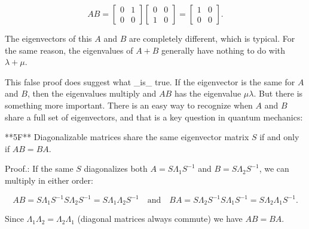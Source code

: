 \[AB=\begin{bmatrix}0&1\\ 0&0\end{bmatrix}\begin{bmatrix}0&0\\ 1&0\end{bmatrix}=\begin{bmatrix}1&0\\ 0&0\end{bmatrix}.\]

The eigenvectors of this \(A\) and \(B\) are completely different, which is typical. For the same reason, the eigenvalues of \(A+B\) generally have nothing to do with \(\lambda+\mu\).

This false proof does suggest what _is_ true. If the eigenvector is the same for \(A\) and \(B\), then the eigenvalues multiply and \(AB\) has the eigenvalue \(\mu\lambda\). But there is something more important. There is an easy way to recognize when \(A\) and \(B\) share a full set of eigenvectors, and that is a key question in quantum mechanics:

**5F** Diagonalizable matrices share the same eigenvector matrix \(S\) if and only if \(AB=BA\).

Proof.: If the same \(S\) diagonalizes both \(A=S\Lambda_{1}S^{-1}\) and \(B=S\Lambda_{2}S^{-1}\), we can multiply in either order:

\[AB=S\Lambda_{1}S^{-1}S\Lambda_{2}S^{-1}=S\Lambda_{1}\Lambda_{2}S^{-1}\quad \text{and}\quad BA=S\Lambda_{2}S^{-1}S\Lambda_{1}S^{-1}=S\Lambda_{2}\Lambda_{ 1}S^{-1}.\]

Since \(\Lambda_{1}\Lambda_{2}=\Lambda_{2}\Lambda_{1}\) (diagonal matrices always commute) we have \(AB=BA\).

 